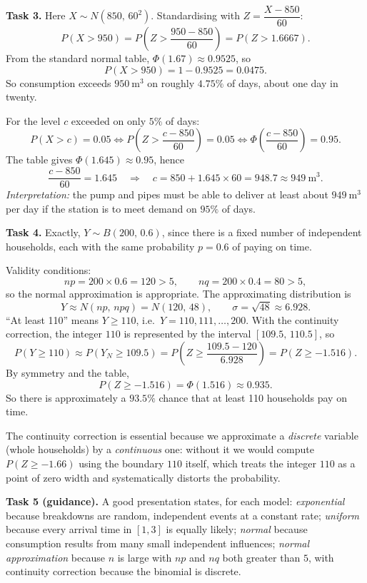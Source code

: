 \documentclass[11pt]{article}
\begin{document}
\textbf{Task 3.} Here $X\sim N(850,\,60^2)$. Standardising with $Z=\dfrac{X-850}{60}$:
\[
P(X>950)=P\!\left(Z>\frac{950-850}{60}\right)=P(Z>1.6667).
\]
From the standard normal table, $\Phi(1.67)\approx 0.9525$, so
\[
P(X>950)=1-0.9525=0.0475.
\]
So consumption exceeds $950\ \mathrm{m^3}$ on roughly $4.75\%$ of days, about one day in twenty.

For the level $c$ exceeded on only $5\%$ of days:
\[
P(X>c)=0.05 \iff P\!\left(Z>\frac{c-850}{60}\right)=0.05
\iff \Phi\!\left(\frac{c-850}{60}\right)=0.95.
\]
The table gives $\Phi(1.645)\approx 0.95$, hence
\[
\frac{c-850}{60}=1.645 \quad\Longrightarrow\quad c=850+1.645\times 60=948.7\approx 949\ \mathrm{m^3}.
\]
\emph{Interpretation:} the pump and pipes must be able to deliver at least about $949\ \mathrm{m^3}$ per day if the station is to meet demand on $95\%$ of days.

\textbf{Task 4.} Exactly, $Y\sim B(200,\,0.6)$, since there is a fixed number of independent households, each with the same probability $p=0.6$ of paying on time.

Validity conditions:
\[
np=200\times 0.6=120>5,\qquad nq=200\times 0.4=80>5,
\]
so the normal approximation is appropriate. The approximating distribution is
\[
Y\approx N(np,\,npq)=N(120,\,48),\qquad \sigma=\sqrt{48}\approx 6.928.
\]
``At least 110'' means $Y\geq 110$, i.e.\ $Y=110,111,\dots,200$. With the continuity correction, the integer $110$ is represented by the interval $[109.5,\,110.5]$, so
\[
P(Y\geq 110)\approx P(Y_N\geq 109.5)
=P\!\left(Z\geq \frac{109.5-120}{6.928}\right)
=P(Z\geq -1.516).
\]
By symmetry and the table,
\[
P(Z\geq -1.516)=\Phi(1.516)\approx 0.935.
\]
So there is approximately a $93.5\%$ chance that at least 110 households pay on time.

The continuity correction is essential because we approximate a \emph{discrete} variable (whole households) by a \emph{continuous} one: without it we would compute $P(Z\geq -1.66)$ using the boundary $110$ itself, which treats the integer $110$ as a point of zero width and systematically distorts the probability.

\textbf{Task 5 (guidance).} A good presentation states, for each model: \emph{exponential} because breakdowns are random, independent events at a constant rate; \emph{uniform} because every arrival time in $[1,3]$ is equally likely; \emph{normal} because consumption results from many small independent influences; \emph{normal approximation} because $n$ is large with $np$ and $nq$ both greater than $5$, with continuity correction because the binomial is discrete.
\end{document}
